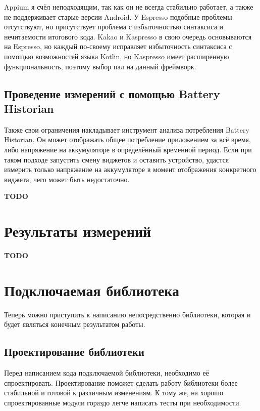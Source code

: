 \documentclass[a4paper,14pt]{extarticle} %
\begin{document}
	Appium я счёл неподходящим, так как он не всегда стабильно работает, а также не поддерживает старые версии Android. У Espresso подобные проблемы отсутствуют, но присутствует проблема с избыточностью синтаксиса и нечитаемости итогового кода. Kakao и Kaspresso в свою очередь основываются на Espresso, но каждый по-своему исправляет избыточность синтаксиса с помощью возможностей языка Kotlin, но Kaspresso имеет расширенную функциональность, поэтому выбор пал на данный фреймворк.
	
	\subsection{Проведение измерений с помощью Battery Historian}
	
	Также свои ограничения накладывает инструмент анализа потребления Battery Historian. Он может отображать общее потребление приложением за всё время, либо напряжение на аккумуляторе в определённый временной период. Если при таком подходе запустить смену виджетов и оставить устройство, удастся измерить только напряжение на аккумуляторе в момент отображения конкретного виджета, чего может быть недостаточно.
	
	\textbf{\Huge TODO}
	
	\newpage
	\section{Результаты измерений}
	
	\textbf{\Huge TODO}
	
	\newpage
	\section{Подключаемая библиотека}
	
	Теперь можно приступить к написанию непосредственно библиотеки, которая и будет являться конечным результатом работы.
	
	\subsection{Проектирование библиотеки}
	
	Перед написанием кода подключаемой библиотеки, необходимо её спроектировать. Проектирование поможет сделать работу библиотеки более стабильной и готовой к различным изменениям. К тому же, на хорошо спроектированные модули гораздо легче написать тесты при необходимости. 
	
\end{document}
